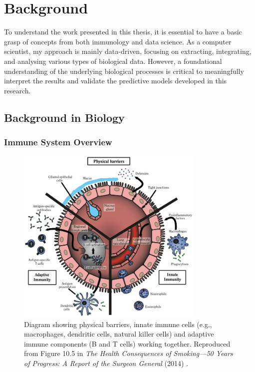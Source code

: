 \documentclass[12pt,a4paper]{report}
\begin{document}
\chapter{Background}

To understand the work presented in this thesis, it is essential to have a basic grasp of concepts from both immunology and data science. As a computer scientist, my approach is mainly data-driven, focusing on extracting, integrating, and analysing various types of biological data. However, a foundational understanding of the underlying biological processes is critical to meaningfully interpret the results and validate the predictive models developed in this research.

\section{Background in Biology}

\subsection{Immune System Overview}

\begin{figure}[h]
  \centering
  \includegraphics[width=0.8\textwidth]{images/Diagram_of_innate_and_adaptive_immunity.jpg}
  \caption[Diagram of Innate and Adaptive Immunity]{Diagram showing physical barriers, innate immune cells (e.g., macrophages, dendritic cells, natural killer cells) and adaptive immune components (B and T cells) working together. Reproduced from Figure 10.5 in \emph{The Health Consequences of Smoking—50 Years of Progress: A Report of the Surgeon General} (2014) \cite{smoking2014}.}
  \label{fig:immunity}
\end{figure}
\end{document}

